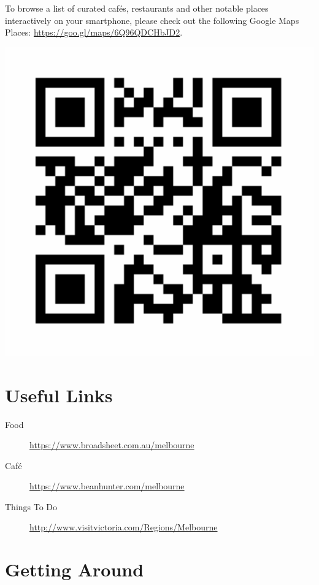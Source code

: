 To browse a list of curated caf{\'e}s, restaurants and other notable places interactively on your smartphone, please check out the following Google Maps Places: \url{https://goo.gl/maps/6Q96QDCHbJD2}.
\vspace*{-1.3em}
\begin{center}
\includegraphics[scale=0.2]{content/local-guide/gmaps.pdf}
\end{center}

\section*{Useful Links}
\vspace*{-1em}

\begin{description}
\item[Food] \url{https://www.broadsheet.com.au/melbourne}
\item[Caf{\'e}] \url{https://www.beanhunter.com/melbourne}
\item[Things To Do] \url{http://www.visitvictoria.com/Regions/Melbourne}
\end{description}

\section*{Getting Around}

